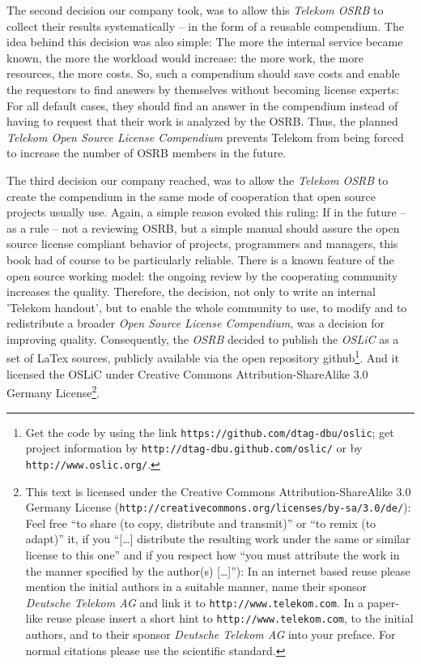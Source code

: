 The second decision our company took, was to allow this \emph{Telekom OSRB} to
collect their results systematically -- in the form of a reusable compendium.
The idea behind this decision was also simple: The more the internal service
became known, the more the workload would increase: the more work, the more
resources, the more costs. So, such a compendium should save costs and enable
the requestors to find answers by themselves without becoming license experts:
For all default cases, they should find an answer in the compendium instead of
having to request that their work is analyzed by the OSRB. Thus, the planned
\emph{Telekom Open Source License Compendium} prevents Telekom from being forced
to increase the number of OSRB members in the future.

The third decision our company reached, was to allow the \emph{Telekom OSRB} to
create the compendium in the same mode of cooperation that open source projects
usually use. Again, a simple reason evoked this ruling: If in the future
-- as a rule -- not a reviewing OSRB, but a simple manual should assure the open
source license compliant behavior of projects, programmers and managers, this
book had of course to be particularly reliable. There is a known feature of the
open source working model: the ongoing review by the cooperating community
increases the quality. Therefore, the decision, not only to write an internal
'Telekom handout', but to enable the whole community to use, to modify and to
redistribute a broader \emph{Open Source License Compendium}, was a decision for
improving quality. Consequently, the \emph{OSRB} decided to publish the
\emph{OSLiC} as a set of LaTex sources, publicly available via the open
repository github\footnote{Get the code by using the link
\texttt{https://github.com/dtag-dbu/oslic}; get project information by
\texttt{http://dtag-dbu.github.com/oslic/} or by
\texttt{http://www.oslic.org/}.}. And it licensed the OSLiC under Creative
Commons Attribution-ShareAlike 3.0 Germany License\footnote{ This text is
licensed under the Creative Commons Attribution-ShareAlike 3.0 Germany License
(\texttt{http://creativecommons.org/licenses/by-sa/3.0/de/}): Feel free
\enquote{to share (to copy, distribute and transmit)} or \enquote{to remix (to
adapt)} it, if you \enquote{[\ldots] distribute the resulting work under the
same or similar license to this one} and if you respect how \enquote{you must
attribute the work in the manner specified by the author(s) [\ldots]}):
In an internet based reuse please mention the initial authors in a suitable
manner, name their sponsor \textit{Deutsche Telekom AG} and link it to
\texttt{http://www.telekom.com}. In a paper-like reuse please insert a short
hint to \texttt{http://www.telekom.com}, to the initial authors, and to their
sponsor \textit{Deutsche Telekom AG} into your preface. For normal citations
please use the scientific standard.}.

